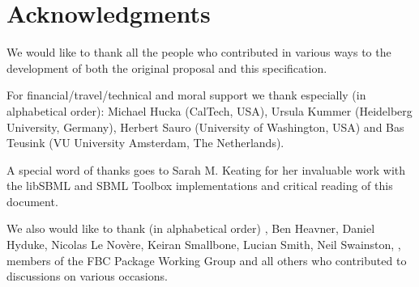 
\section{Acknowledgments}

We would like to thank all the people who contributed in various ways to the development of both the original proposal and this specification.

For financial/travel/technical and moral support we thank especially (in alphabetical order): Michael Hucka (CalTech, USA), Ursula Kummer (Heidelberg University, Germany), Herbert Sauro (University of Washington, USA) and Bas Teusink (VU University Amsterdam, The Netherlands).

A special word of thanks goes to Sarah M. Keating for her invaluable work with the \textsf{libSBML} and \textsf{SBML Toolbox} implementations and critical reading of this document.

We also would like to thank (in alphabetical order) , Ben Heavner, Daniel Hyduke, Nicolas Le Nov\`{e}re, Keiran Smallbone, Lucian Smith, Neil Swainston, , members of the \textsf{FBC Package Working Group} and all others who contributed to discussions on various occasions.


